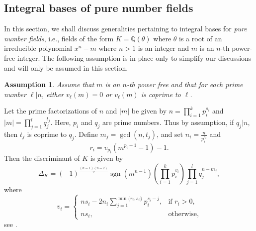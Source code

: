 \documentclass[table]{amsart}
\newtheorem{ass}[theorem]{Assumption}
\newcommand{\cO}{\mathcal{O}}
\newcommand{\op}[1]{\operatorname{#1}}
\numberwithin{equation}{section}
\begin{document}
\subsection{Integral bases of pure number fields}
In this section, we shall discuss generalities pertaining to integral bases for \emph{pure number fields}, i.e., fields of the form $ K = \mathbb{Q}(\theta) $ where $\theta$ is a root of an irreducible polynomial $x^n-m$ where $n>1$ is an integer and $m$ is an $n$-th power-free integer. The following assumption is in place only to simplify our discussions and will only be assumed in this section.
\begin{ass}\label{basic ass section 2.3}
    Assume that $m$ is an $ n $-th power free and that for each prime number $\ell|n$, either $ v_{\ell}(m) = 0 $ or $ v_{\ell}(m) $ is coprime to $ \ell $.
\end{ass}
Let the prime factorizations of $ n $ and $ |m| $ be given by $n= \prod_{i=1}^{k} p_i^{s_i}$ and $|m| = \prod_{j=1}^{l} q_j^{t_j}$. Here, $p_i$ and $q_j$ are prime numbers. Thus by assumption, if $q_j|n$, then $t_j$ is coprime to $q_j$.
Define $ m_j = \gcd(n, t_j) $, and set $ n_i = \frac{n}{p_{i}^{s_i}} $ and  
\[
r_i = v_{p_i}(m^{p_i - 1} - 1) - 1.
\]
\noindent Then the discriminant of $ K $ is given by  
\[
\Delta_K = (-1)^{\frac{(n-1)(n-2)}{2}} \operatorname{sgn}(m^{n-1}) \left( \prod_{i=1}^{k} p_i^{v_i} \right) \prod_{j=1}^{l} q_j^{n - m_j},
\]  
where  
\[
v_i =
\begin{cases}
n s_i - 2 n_i \sum_{j=1}^{\min \{ r_i, s_i \} } p_i^{s_i - j}, & \text{if } r_i > 0, \\
n s_i, & \text{otherwise,}
\end{cases}
\]
see \cite[Theorem 1.A]{JKSMathematika}. %
\end{document}
